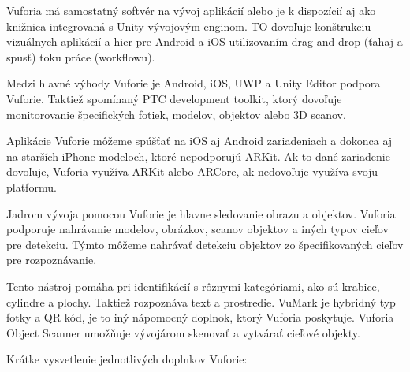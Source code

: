 Vuforia má samostatný softvér na vývoj aplikácií alebo je k dispozícií aj ako knižnica integrovaná s Unity vývojovým enginom. TO dovoľuje konštrukciu vizuálnych aplikácií a hier pre Android a iOS utilizovaním drag-and-drop (ťahaj a spusť) toku práce (workflowu).

Medzi hlavné výhody Vuforie je Android, iOS, UWP a Unity Editor podpora Vuforie. Taktiež spomínaný PTC development toolkit, ktorý dovoľuje monitorovanie špecifických fotiek, modelov, objektov alebo 3D scanov.

Aplikácie Vuforie môžeme spúšťať na iOS aj Android zariadeniach a dokonca aj na starších iPhone modeloch, ktoré nepodporujú ARKit. Ak to dané zariadenie dovoľuje, Vuforia využíva ARKit alebo ARCore, ak nedovoľuje využíva svoju platformu.

Jadrom vývoja pomocou Vuforie je hlavne sledovanie obrazu a objektov. Vuforia podporuje nahrávanie modelov, obrázkov, scanov objektov a iných typov cieľov pre detekciu. Týmto môžeme nahrávať detekciu objektov zo špecifikovaných cieľov pre rozpoznávanie.

Tento nástroj pomáha pri identifikácií s rôznymi kategóriami, ako sú krabice, cylindre a plochy. Taktiež rozpoznáva text a prostredie. VuMark je hybridný typ fotky a QR kód, je to iný nápomocný doplnok, ktorý Vuforia poskytuje. Vuforia Object Scanner umožňuje vývojárom skenovať a vytvárať cieľové objekty. 

Krátke vysvetlenie jednotlivých doplnkov Vuforie:

